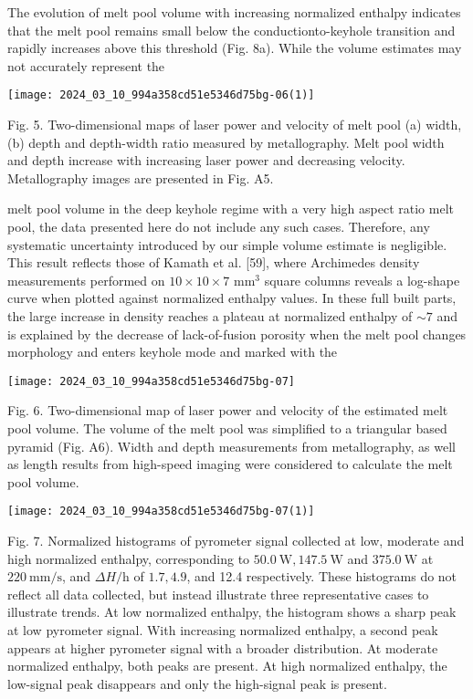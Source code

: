 \documentclass[10pt]{article}
\begin{document}
The evolution of melt pool volume with increasing normalized enthalpy indicates that the melt pool remains small below the conductionto-keyhole transition and rapidly increases above this threshold (Fig. 8a). While the volume estimates may not accurately represent the

\begin{center}
\texttt{[image: 2024\_03\_10\_994a358cd51e5346d75bg-06(1)]}
\end{center}

Fig. 5. Two-dimensional maps of laser power and velocity of melt pool (a) width, (b) depth and depth-width ratio measured by metallography. Melt pool width and depth increase with increasing laser power and decreasing velocity. Metallography images are presented in Fig. A5.

melt pool volume in the deep keyhole regime with a very high aspect ratio melt pool, the data presented here do not include any such cases. Therefore, any systematic uncertainty introduced by our simple volume estimate is negligible. This result reflects those of Kamath et al. [59], where Archimedes density measurements performed on $10 \times 10 \times 7$ $\mathrm{mm}^{3}$ square columns reveals a log-shape curve when plotted against normalized enthalpy values. In these full built parts, the large increase in density reaches a plateau at normalized enthalpy of $\sim 7$ and is explained by the decrease of lack-of-fusion porosity when the melt pool changes morphology and enters keyhole mode and marked with the

\begin{center}
\texttt{[image: 2024\_03\_10\_994a358cd51e5346d75bg-07]}
\end{center}

Fig. 6. Two-dimensional map of laser power and velocity of the estimated melt pool volume. The volume of the melt pool was simplified to a triangular based pyramid (Fig. A6). Width and depth measurements from metallography, as well as length results from high-speed imaging were considered to calculate the melt pool volume.

\begin{center}
\texttt{[image: 2024\_03\_10\_994a358cd51e5346d75bg-07(1)]}
\end{center}

Fig. 7. Normalized histograms of pyrometer signal collected at low, moderate and high normalized enthalpy, corresponding to $50.0 \mathrm{~W}, 147.5 \mathrm{~W}$ and $375.0 \mathrm{~W}$ at $220 \mathrm{~mm} / \mathrm{s}$, and $\Delta H / \mathrm{h}$ of $1.7,4.9$, and 12.4 respectively. These histograms do not reflect all data collected, but instead illustrate three representative cases to illustrate trends. At low normalized enthalpy, the histogram shows a sharp peak at low pyrometer signal. With increasing normalized enthalpy, a second peak appears at higher pyrometer signal with a broader distribution. At moderate normalized enthalpy, both peaks are present. At high normalized enthalpy, the low-signal peak disappears and only the high-signal peak is present.
\end{document}
